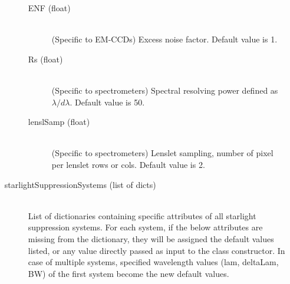 \documentclass[cleanfoot]{asme2ej}
\begin{document}
\begin{itemize}
\begin{description}
\begin{description}
        \item[ENF (float)] \hfill \\ (Specific to EM-CCDs) Excess noise factor. Default value is 1.
        \item[Rs (float)] \hfill \\ (Specific to spectrometers) Spectral resolving power defined as $\lambda/d\lambda$. Default value is 50. 
        \item[lenslSamp (float)] \hfill \\ (Specific to spectrometers) Lenslet sampling, number of pixel per lenslet rows or cols. Default value is 2.
    \end{description}
    \item[starlightSuppressionSystems (list of dicts)] \hfill\\ List of dictionaries containing specific attributes of all starlight suppression systems. For each system, if the below attributes are missing from the dictionary, they will be assigned the default values listed, or any value directly passed as input to the class constructor. In case of multiple systems, specified wavelength values (lam, deltaLam, BW) of the first system become the new default values.
    

\end{description}
\end{itemize}
\end{document}
